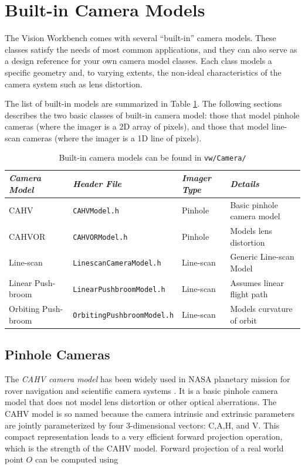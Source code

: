 \section{Built-in Camera Models}
\label{sec:built-in-cameras}
The Vision Workbench comes with several ``built-in'' camera models.
These classes satisfy the needs of most common applications, and they
can also serve as a design reference for your own camera model
classes.  Each class models a specific geometry and, to varying
extents, the non-ideal characteristics of the camera system such as
lens distortion.

The list of built-in models are summarized in Table
\ref{tab:camera-models}.  The following sections describes the two
basic classes of built-in camera model: those that model pinhole
cameras (where the imager is a 2D array of pixels), and those that
model line-scan cameras (where the imager is a 1D line of pixels).

\begin{table}[tdp]
\begin{center}
\begin{tabular}{|l|l|l|l|}
\hline
{\em Camera Model} & {\em Header File} & {\em Imager Type} & {\em Details}\\
\hline CAHV         & {\tt CAHVModel.h} & Pinhole     & Basic pinhole camera model \\
CAHVOR       & {\tt CAHVORModel.h} & Pinhole     & Models lens distortion\\
Line-scan     & {\tt LinescanCameraModel.h} & Line-scan & Generic Line-scan Model \\
Linear Push-broom    & {\tt LinearPushbroomModel.h} & Line-scan & Assumes linear flight path \\
Orbiting Push-broom & {\tt OrbitingPushbroomModel.h} & Line-scan & Models curvature of orbit \\
\hline
\end{tabular}
\end{center}
\label{tab:camera-models}
\caption{Built-in camera models can be found in {\tt vw/Camera/} }
\end{table}

\subsection{Pinhole Cameras}

The {\em CAHV camera model} has been widely used in NASA planetary
mission for rover navigation and scientific camera systems
\cite{yakimovsky78}.  It is a basic pinhole camera model that does not
model lens distortion or other optical aberrations.  The CAHV model is
so named because the camera intrinsic and extrinsic parameters are
jointly parameterized by four 3-dimensional vectors: C,A,H, and V.
This compact representation leads to a very efficient forward
projection operation, which is the strength of the CAHV model.
Forward projection of a real world point $O$ can be computed using

